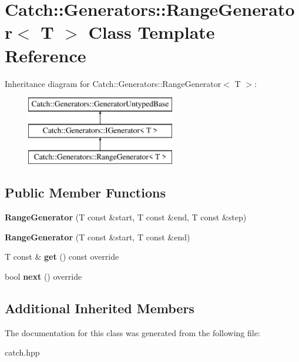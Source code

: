 \hypertarget{classCatch_1_1Generators_1_1RangeGenerator}{}\section{Catch\+::Generators\+::Range\+Generator$<$ T $>$ Class Template Reference}
\label{classCatch_1_1Generators_1_1RangeGenerator}
Inheritance diagram for Catch\+::Generators\+::Range\+Generator$<$ T $>$\+:\begin{figure}[H]
\begin{center}
\leavevmode
\includegraphics[height=3.000000cm]{classCatch_1_1Generators_1_1RangeGenerator}
\end{center}
\end{figure}
\subsection*{Public Member Functions}
\begin{DoxyCompactItemize}
\item 
\mbox{\label{classCatch_1_1Generators_1_1RangeGenerator_a6a9b3cc009471c085c985642e0ab102e}} 
{\bfseries Range\+Generator} (T const \&start, T const \&end, T const \&step)
\item 
\mbox{\label{classCatch_1_1Generators_1_1RangeGenerator_ac999eb143945ff311b97d2c767df90d3}} 
{\bfseries Range\+Generator} (T const \&start, T const \&end)
\item 
\mbox{\label{classCatch_1_1Generators_1_1RangeGenerator_a2639173bb9f06ba353314cd226fcefec}} 
T const  \& {\bfseries get} () const override
\item 
\mbox{\label{classCatch_1_1Generators_1_1RangeGenerator_a4e6b2038832f09724d5a4355b4691259}} 
bool {\bfseries next} () override
\end{DoxyCompactItemize}
\subsection*{Additional Inherited Members}


The documentation for this class was generated from the following file\+:\begin{DoxyCompactItemize}
\item 
catch.\+hpp\end{DoxyCompactItemize}
